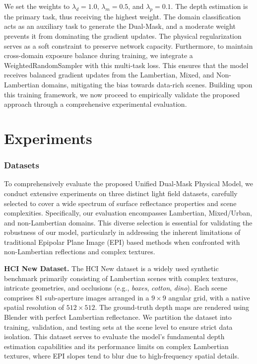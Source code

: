 \documentclass[lettersize,journal]{IEEEtran}
\begin{document}
We set the weights to $\lambda_{d} = 1.0$, $\lambda_{m} = 0.5$, and $\lambda_{p} = 0.1$. The depth estimation is the primary task, thus receiving the highest weight. The domain classification acts as an auxiliary task to generate the Dual-Mask, and a moderate weight prevents it from dominating the gradient updates. The physical regularization serves as a soft constraint to preserve network capacity. Furthermore, to maintain cross-domain exposure balance during training, we integrate a WeightedRandomSampler with this multi-task loss. This ensures that the model receives balanced gradient updates from the Lambertian, Mixed, and Non-Lambertian domains, mitigating the bias towards data-rich scenes. Building upon this training framework, we now proceed to empirically validate the proposed approach through a comprehensive experimental evaluation.

\section{Experiments}

\subsubsection{Datasets}

To comprehensively evaluate the proposed Unified Dual-Mask Physical Model, we conduct extensive experiments on three distinct light field datasets, carefully selected to cover a wide spectrum of surface reflectance properties and scene complexities. Specifically, our evaluation encompasses Lambertian, Mixed/Urban, and non-Lambertian domains. This diverse selection is essential for validating the robustness of our model, particularly in addressing the inherent limitations of traditional Epipolar Plane Image (EPI) based methods when confronted with non-Lambertian reflections and complex textures.

\textbf{HCI New Dataset.} The HCI New dataset \cite{1} is a widely used synthetic benchmark primarily consisting of Lambertian scenes with complex textures, intricate geometries, and occlusions (e.g., \textit{boxes}, \textit{cotton}, \textit{dino}). Each scene comprises 81 sub-aperture images arranged in a $9 \times 9$ angular grid, with a native spatial resolution of $512 \times 512$. The ground-truth depth maps are rendered using Blender \cite{2} with perfect Lambertian reflectance. We partition the dataset into training, validation, and testing sets at the scene level to ensure strict data isolation. This dataset serves to evaluate the model's fundamental depth estimation capabilities and its performance limits on complex Lambertian textures, where EPI slopes tend to blur due to high-frequency spatial details.
\end{document}
